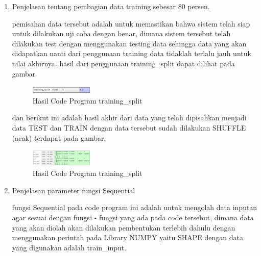 \begin{enumerate}
            \item Penjelasan tentang pembagian data training sebesar 80 persen.
            
            
            
            \subitem pemisahan data tersebut adalah untuk memastikan bahwa sistem telah siap untuk dilakukan uji coba dengan benar, dimana sistem tersebut telah dilakukan test dengan menggunakan testing data sehingga data yang akan didapatkan nanti dari penggunaan training data tidaklah terlalu jauh untuk nilai akhirnya. hasil dari penggunaan training\_split dapat dilihat pada gambar 
            
            \begin{figure}[H]
                \includegraphics[width=3cm]{figures/1174008/6/4.PNG}
                \centering
                  \caption{Hasil Code Program training\_split}
            \end{figure}
            
            \subitem dan berikut ini adalah hasil akhir dari data yang telah dipisahkan menjadi data TEST dan TRAIN dengan data tersebut sudah dilakukan SHUFFLE (acak) terdapat pada gambar.
            
            \begin{figure}[H]
                \includegraphics[width=3cm]{figures/1174008/6/5.PNG}
                \centering
                  \caption{Hasil Code Program training\_split}
            \end{figure}
            
            \item Penjelasan parameter fungsi Sequential
            
            
            
            \subitem fungsi Sequential pada code program ini adalah untuk mengolah data inputan agar sesuai dengan fungsi - fungsi yang ada pada code tersebut, dimana data yang akan diolah akan dilakukan pembentukan terlebih dahulu dengan menggunakan perintah pada Library NUMPY yaitu SHAPE dengan data yang digunakan adalah train\_input.
            

\end{enumerate}
